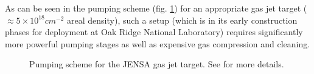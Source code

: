 As can be seen in the pumping scheme (fig. \ref{fig:jensa}) for an appropriate gas jet target ($\approx 5\times10^{18} \unit{cm^{-2}}$ areal density), such a setup (which is in its early construction phases for deployment at Oak Ridge National Laboratory) requires significantly more powerful pumping stages as well as expensive gas compression and cleaning.\\
 
\begin{figure}
\caption{Pumping scheme for the JENSA gas jet target. See \cite{chi13} for more details.}
\label{fig:jensa}
\end{figure}





